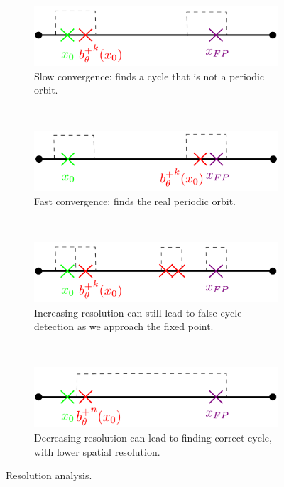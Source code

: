 \documentclass[12pt,a4paper]{article}
\begin{document}
\begin{figure}[tp]	
\centering
	\begin{subfigure}{0.7\textwidth}
		\includegraphics[width=1.0\textwidth]{a.pdf}
		\caption{Slow convergence: finds a cycle that is not a periodic orbit.}
		\label{fig:a}
	\end{subfigure}\\
	\begin{subfigure}{.7\textwidth}
		\includegraphics[width=1.0\linewidth]{b.pdf}
		\caption{Fast convergence: finds the real periodic orbit.}
		\label{fig:b}
	\end{subfigure}\\
	\begin{subfigure}{.7\textwidth}
		\includegraphics[width=1.0\linewidth]{c.pdf}
		\caption{Increasing resolution can still lead to false cycle detection as we
approach the fixed point.}
		\label{fig:c}
	\end{subfigure}\\
	\begin{subfigure}{.7\textwidth}
		\includegraphics[width=1.0\linewidth]{d.pdf}
		\caption{Decreasing resolution can lead to finding correct cycle, with lower
spatial resolution.}
		\label{fig:d}
	\end{subfigure}%
	\caption{Resolution analysis.}
	\label{fig:resolution}	
\end{figure}
\end{document}
